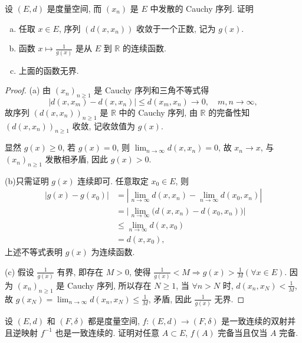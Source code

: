 \begin{exercise}
    设 $(E,d)$ 是度量空间, 而 $(x_n)$ 是 $E$ 中发散的 Cauchy 序列. 证明
    \begin{enumerate}[(a)]
        \item 任取 $x\in E$, 序列 $(d(x,x_n))$ 收敛于一个正数, 记为 $g(x)$.
        \item 函数 $x\mapsto\frac{1}{g(x)}$ 是从 $E$ 到 $\mathbb{R}$ 的连续函数.
        \item 上面的函数无界.
    \end{enumerate}
\end{exercise}

\begin{proof}
    (a) 由 $(x_n)_{n\geq 1}$ 是 Cauchy 序列和三角不等式得
    \[|d(x,x_m)-d(x,x_n)|\leq d(x_m,x_n)\to 0,\quad m,n\to\infty,\]
    故序列 $(d(x,x_n))_{n\geq 1}$ 是 $\mathbb{R}$ 中的 Cauchy 序列, 
    由 $\mathbb{R}$ 的完备性知 $(d(x,x_n))_{n\geq 1}$ 收敛, 记收敛值为 $g(x)$.

    显然 $g(x)\geq 0$, 若 $g(x)=0$, 则 $\lim_{n\to\infty}d(x,x_n)=0$, 
    故 $x_n\to x$, 与 $(x_n)_{n\geq 1}$ 发散相矛盾, 因此 $g(x)>0$.

    (b)只需证明 $g(x)$ 连续即可. 任意取定 $x_0\in E$, 则
    \begin{align*}
        |g(x)-g(x_0)| & =|\lim_{n\to\infty}d(x,x_n)-\lim_{n\to\infty}d(x_0,x_n)| \\
                      & =\bigl|\lim_{n\to\infty}\bigl(d(x,x_n)-d(x_0,x_n)\bigr)\bigr| \\
                      & \leq\lim_{n\to\infty}d(x,x_0) \\
                      & =d(x,x_0),
    \end{align*}
    上述不等式表明 $g(x)$ 为连续函数.

    (c) 假设 $\frac{1}{g(x)}$ 有界, 即存在 $M>0$,
    使得 $\frac{1}{g(x)}<M\Rightarrow g(x)>\frac{1}{M}(\forall x\in E)$.
    因为 $(x_n)_{n\geq 1}$ 是 Cauchy 序列, 
    所以存在 $N\geq 1$, 当 $\forall n>N$ 时, $d(x_n,x_N)<\frac{1}{M}$,
    故 $g(x_N)=\lim_{n\to\infty}d(x_n,x_N)\leq\frac{1}{M}$, 矛盾, 因此 $\frac{1}{g(x)}$ 无界.
\end{proof}


\begin{exercise}
    设 $(E,d)$ 和 $(F,\delta)$ 都是度量空间, $f:(E,d)\to (F,\delta)$
    是一致连续的双射并且逆映射 $f^{-1}$ 也是一致连续的.
    证明对任意 $A\subset E$, $f(A)$ 完备当且仅当 $A$ 完备.
\end{exercise}

